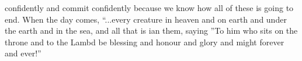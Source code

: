\begin{itemize}
{  confidently and commit confidently because we know how all of these is
  going to end.  When the day comes, ``...every creature in heaven and on
  earth and under the earth and in the sea, and all that is ian them, saying
  ''To him who sits on the throne and to the Lambd be blessing and honour and
  glory and might forever and ever!''}
\end{itemize}